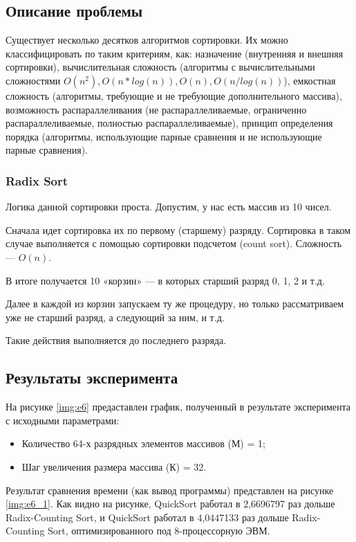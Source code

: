 \subsection*{Описание проблемы}
Существует несколько десятков алгоритмов сортировки. Их можно классифицировать по таким критериям, как: назначение (внутренняя и внешняя сортировки), вычислительная сложность (алгоритмы с вычислительными сложностями $O(n^2), O(n*log(n)), O(n), O(n/log(n))$), емкостная сложность (алгоритмы, требующие и не требующие дополнительного массива), возможность распараллеливания (не распараллеливаемые, ограниченно распараллеливаемые, полностью распараллеливаемые), принцип определения порядка (алгоритмы, использующие парные сравнения и не использующие парные сравнения).  

\subsubsection{Radix Sort}

Логика данной сортировки проста. Допустим, у нас есть массив из 10 чисел.

Сначала идет сортировка их по первому (старшему) разряду. Сортировка в таком случае выполняется с помощью сортировки подсчетом (count sort). Сложность — $O(n)$. 

В итоге получается 10 «корзин» — в которых старший разряд 0, 1, 2 и т.д.

Далее в каждой из корзин запускаем ту же процедуру, но только рассматриваем уже не старший разряд, а следующий за ним, и т.д.

Такие действия выполняется до последнего разряда.

\subsection*{Результаты эксперимента}
На рисунке \ref{img:e6} предаставлен график, полученный в результате эксперимента с исходными параметрами:
\begin{itemize}
	\item Количество 64-х разрядных элементов массивов (М) = 1;
	\item Шаг увеличения размера массива (К) = 32.
\end{itemize}


Результат сравнения времени (как вывод программы) представлен на рисунке \ref{img:e6_1}. Как видно на рисунке, QuickSort работал в 2,6696797 раз дольше Radix-Counting Sort, и QuickSort работал в 4,0447133 раз дольше Radix-Counting Sort, оптимизированного под 8-процессорную ЭВМ.

